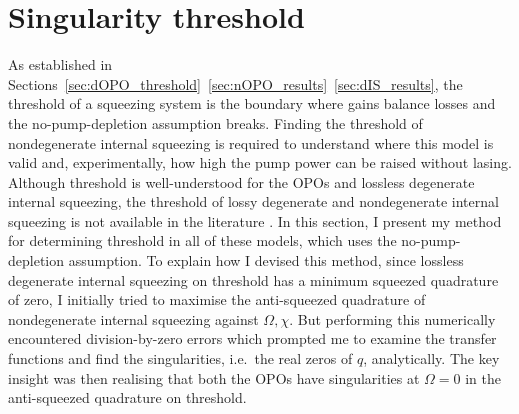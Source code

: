 
\section{Singularity threshold}
\label{sec:singularity_threshold}


As established in Sections~\ref{sec:dOPO_threshold}~\ref{sec:nOPO_results}~\ref{sec:dIS_results}, the threshold of a squeezing system is the boundary where gains balance losses and the no-pump-depletion assumption breaks. Finding the threshold of nondegenerate internal squeezing is required to understand where this model is valid and, experimentally, how high the pump power can be raised without lasing. Although threshold is well-understood for the OPOs and lossless degenerate internal squeezing, the threshold of lossy degenerate and nondegenerate internal squeezing is not available in the literature . In this section, I present my method for determining threshold in all of these models, which uses the no-pump-depletion assumption.
To explain how I devised this method, since lossless degenerate internal squeezing on threshold has a minimum squeezed quadrature of zero, I initially tried to maximise the anti-squeezed quadrature of nondegenerate internal squeezing against $\Omega,\chi$. But performing this numerically encountered division-by-zero errors which prompted me to examine the transfer functions and find the singularities, i.e.\ the real zeros of $q$, analytically. The key insight was then realising that both the OPOs have singularities at $\Omega=0$ in the anti-squeezed quadrature on threshold.

